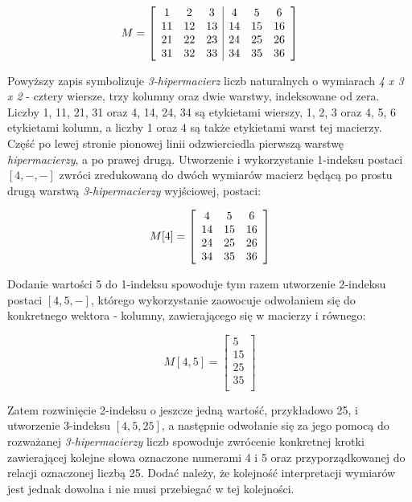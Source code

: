\documentclass[11pt,a4paper]{llncs}
\begin{document}
\begin{center}
\[
M = 
\left[
\begin{array}{c c c | c c c}
1 	& 2 	& 3 	& 4 	& 5 	& 6 	\\
11 	& 12 	& 13 	& 14 	& 15 	& 16 	\\
21 	& 22 	& 23 	& 24 	& 25 	& 26 	\\
31 	& 32 	& 33 	& 34 	& 35	& 36 	\\
\end{array}
\right]
\]
\end{center}

Powyższy zapis symbolizuje \emph{3-hipermacierz} liczb naturalnych o wymiarach \emph{4 x 3 x 2} - cztery wiersze, trzy kolumny oraz dwie warstwy, indeksowane od zera. 
Liczby 1, 11, 21, 31 oraz 4, 14, 24, 34 są etykietami wierszy, 1, 2, 3 oraz 4, 5, 6 etykietami kolumn, a liczby 1 oraz 4 są także etykietami warst tej macierzy.
Część po lewej stronie pionowej linii odzwierciedla pierwszą warstwę \emph{hipermacierzy}, a po prawej drugą.
Utworzenie i wykorzystanie 1-indeksu postaci \( [4, -, -] \) zwróci zredukowaną do dwóch wymiarów macierz będącą po prostu drugą warstwą \emph{3-hipermacierzy} wyjściowej, postaci:

\[
M[4] = 
\left[
\begin{array}{c c c}
4 	& 5 	& 6 	\\
14 	& 15 	& 16 	\\
24 	& 25 	& 26 	\\
34 	& 35	& 36 	\\
\end{array}
\right]
\]

Dodanie wartości 5 do 1-indeksu spowoduje tym razem utworzenie 2-indeksu postaci \( [4, 5, -] \), którego wykorzystanie zaowocuje odwołaniem się do konkretnego wektora - kolumny, zawierającego się w macierzy i równego:

\[
M[4, 5] = 
\left[
\begin{array}{c}
5 \\
15 \\
25 \\
35 \\
\end{array}
\right]
\]

Zatem rozwinięcie 2-indeksu o jeszcze jedną wartość, przykładowo 25, i utworzenie 3-indeksu $[4, 5, 25]$, a następnie odwołanie się za jego pomocą do rozważanej \emph{3-hipermacierzy} liczb spowoduje zwrócenie konkretnej krotki zawierającej kolejne słowa oznaczone numerami 4 i 5 oraz przyporządkowanej do relacji oznaczonej liczbą 25.
Dodać należy, że kolejność interpretacji wymiarów jest jednak dowolna i nie musi przebiegać w tej kolejności.
\end{document}
